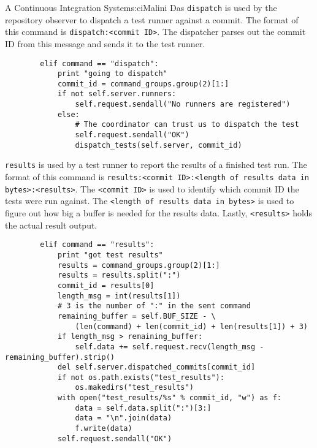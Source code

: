 \begin{aosachapter}{A Continuous Integration System}{s:ci}{Malini Das}
\texttt{dispatch} is used by the repository observer to dispatch a test
runner against a commit. The format of this command is
\texttt{dispatch:\textless{}commit ID\textgreater{}}. The dispatcher
parses out the commit ID from this message and sends it to the test
runner.

\begin{verbatim}
        elif command == "dispatch":
            print "going to dispatch"
            commit_id = command_groups.group(2)[1:]
            if not self.server.runners:
                self.request.sendall("No runners are registered")
            else:
                # The coordinator can trust us to dispatch the test
                self.request.sendall("OK")
                dispatch_tests(self.server, commit_id)
\end{verbatim}

\texttt{results} is used by a test runner to report the results of a
finished test run. The format of this command is
\texttt{results:\textless{}commit ID\textgreater{}:\textless{}length of results data in bytes\textgreater{}:\textless{}results\textgreater{}}.
The \texttt{\textless{}commit ID\textgreater{}} is used to identify
which commit ID the tests were run against. The
\texttt{\textless{}length of results data in bytes\textgreater{}} is
used to figure out how big a buffer is needed for the results data.
Lastly, \texttt{\textless{}results\textgreater{}} holds the actual
result output.

\begin{verbatim}
        elif command == "results":
            print "got test results"
            results = command_groups.group(2)[1:]
            results = results.split(":")
            commit_id = results[0]
            length_msg = int(results[1])
            # 3 is the number of ":" in the sent command
            remaining_buffer = self.BUF_SIZE - \
                (len(command) + len(commit_id) + len(results[1]) + 3)
            if length_msg > remaining_buffer:
                self.data += self.request.recv(length_msg - remaining_buffer).strip()
            del self.server.dispatched_commits[commit_id]
            if not os.path.exists("test_results"):
                os.makedirs("test_results")
            with open("test_results/%s" % commit_id, "w") as f:
                data = self.data.split(":")[3:]
                data = "\n".join(data)
                f.write(data)
            self.request.sendall("OK")
\end{verbatim}

\label{the-test-runner-testux5frunner.py}


\end{aosachapter}
